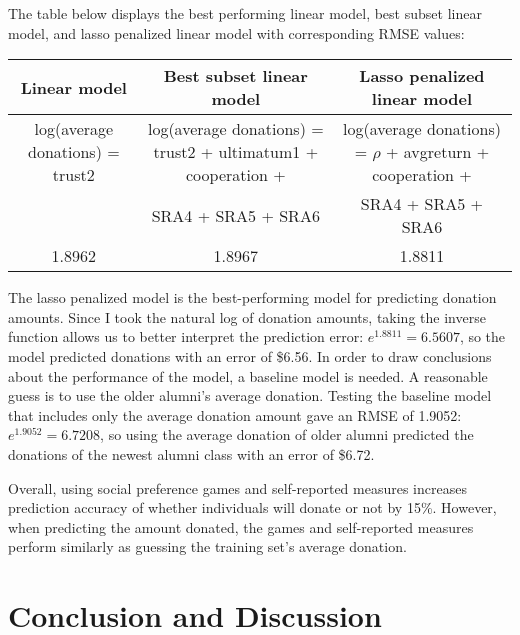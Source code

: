 \documentclass[12pt]{article}
\begin{document}
The table below displays the best performing linear model, best subset linear model, and lasso penalized linear model with corresponding RMSE values:
 
\vspace{6mm} \begin{adjustbox}{width=\textwidth}
\begin{tabular}{ c | c | c }
\hline \hline
Linear model & Best subset linear model & Lasso penalized linear model \\
\hline
log(average donations) = trust2 & log(average donations) = trust2 + ultimatum1 + cooperation + & log(average donations) = \(\rho\) + avgreturn + cooperation + \\
\small &  SRA4 + SRA5 + SRA6 & SRA4 + SRA5 + SRA6 \\
\hline
1.8962 & 1.8967 & 1.8811 \\
\hline \hline
\end{tabular}
\end{adjustbox}


\vspace{6mm} The lasso penalized model is the best-performing model for predicting donation amounts. Since I took the natural log of donation amounts, taking the inverse function allows us to better interpret the prediction error: \(e^{1.8811} = 6.5607\), so the model predicted donations with an error of \$6.56. In order to draw conclusions about the performance of the model, a baseline model is needed. A reasonable guess is to use the older alumni\rq s average donation. Testing the baseline model that includes only the average donation amount gave an RMSE of 1.9052: \(e^{1.9052} = 6.7208\), so using the average donation of older alumni predicted the donations of the newest alumni class with an error of \$6.72. 


Overall, using social preference games and self-reported measures increases prediction accuracy of whether individuals will donate or not by 15\%. However, when predicting the amount donated, the games and self-reported measures perform similarly as guessing the training set\rq s average donation.


\section{Conclusion and Discussion}
\end{document}
